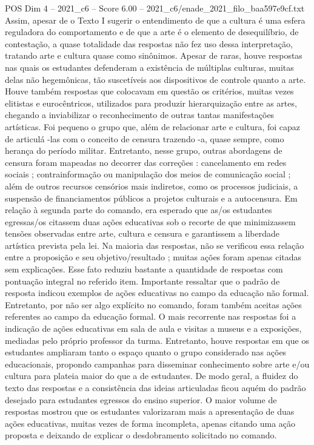 \begin{textsample}{POS Dim 4 – 2021\_c6 – Score 6.00 – 2021\_c6/enade\_2021\_filo\_baa597e9cf.txt}
Assim, apesar de o Texto I sugerir o entendimento de que a cultura é uma esfera reguladora do comportamento e de que a arte é o elemento de desequilíbrio, de contestação, a quase totalidade das respostas não fez uso dessa interpretação, tratando arte e cultura quase como sinônimos.
Apesar de raras, houve respostas nas quais os estudantes defenderam a existência de múltiplas culturas, muitas delas não hegemônicas, tão suscetíveis aos dispositivos de controle quanto a arte.
Houve também respostas que colocavam em questão os critérios, muitas vezes elitistas e eurocêntricos, utilizados para produzir hierarquização entre as artes, chegando a inviabilizar o reconhecimento de outras tantas manifestações artísticas.
Foi pequeno o grupo que, além de relacionar arte e cultura, foi capaz de articulá -las com o conceito de censura trazendo -a, quase sempre, como herança do período militar.
Entretanto, nesse grupo, outras abordagens de censura foram mapeadas no decorrer das correções : cancelamento em redes sociais ; contrainformação ou manipulação dos meios de comunicação social ; além de outros recursos censórios mais indiretos, como os processos judiciais, a suspensão de financiamentos públicos a projetos culturais e a autocensura.
Em relação à segunda parte do comando, era esperado que as/os estudantes egressas/os citassem duas ações educativas sob o recorte de que minimizassem tensões observadas entre arte, cultura e censura e garantissem a liberdade artística prevista pela lei.
Na maioria das respostas, não se verificou essa relação entre a proposição e seu objetivo/resultado ; muitas ações foram apenas citadas sem explicações.
Esse fato reduziu bastante a quantidade de respostas com pontuação integral no referido item.
Importante ressaltar que o padrão de resposta indicou exemplos de ações educativas no campo da educação não formal.
Entretanto, por não ser algo explícito no comando, foram também aceitas ações referentes ao campo da educação formal.
O mais recorrente nas respostas foi a indicação de ações educativas em sala de aula e visitas a museus e a exposições, mediadas pelo próprio professor da turma.
Entretanto, houve respostas em que os estudantes ampliaram tanto o espaço quanto o grupo considerado nas ações educacionais, propondo campanhas para disseminar conhecimento sobre arte e/ou cultura para plateia maior do que a de estudantes.
De modo geral, a fluidez do texto das respostas e a consistência das ideias articuladas ficou aquém do padrão desejado para estudantes egressos do ensino superior.
O maior volume de respostas mostrou que os estudantes valorizaram mais a apresentação de duas ações educativas, muitas vezes de forma incompleta, apenas citando uma ação proposta e deixando de explicar o desdobramento solicitado no comando.

\end{textsample}
